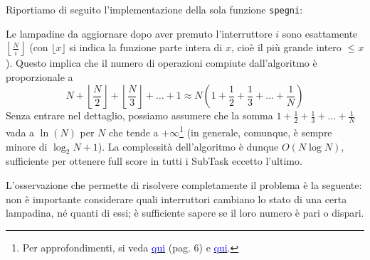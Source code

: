     Riportiamo di seguito l'implementazione della sola funzione \texttt{spegni}:
    
    \colorbox{white}{}
    
    \begin{comment}
        \begin{lstlisting}[language=C++]
int spegni(int N) {
    int ans = 0;
    
    // Preme l'i-esimo interruttore
    for (int i = 1; i <= N; i++)
        // Inverte tutte le lampadine multiple di i
        for (int j = i; j <= N; j += i)
            luci[j] ^= true;

    for (int i = 1; i <= N; i++)
        ans += !luci[i];

    return ans;
}
        \end{lstlisting}
    \end{comment}
    
    Le lampadine da aggiornare dopo aver premuto l'interruttore $i$ sono esattamente $\displaystyle \left \lfloor \frac N i \right \rfloor$ (con $\lfloor x \rfloor$ si indica la funzione parte intera di $x$, cioè il più grande intero $\leq x$). Questo implica che il numero di operazioni compiute dall'algoritmo è proporzionale a \[N + \left \lfloor \frac N 2 \right \rfloor + \left \lfloor \frac N 3 \right \rfloor + \dots + 1 \approx N \left ( 1 + \frac 1 2 + \frac 1 3 + \dots + \frac 1 N \right )\]
    Senza entrare nel dettaglio, possiamo assumere che la somma $\displaystyle 1 + \frac 1 2 + \frac 1 3 + \dots + \frac 1 N$ vada a $\ln (N)$ per $N$ che tende a $+ \infty$\footnote{Per approfondimenti, si veda \href{https://docs.google.com/file/d/0Bz82dCddeD8ieVZyUU9VMVI5bjA/view}{\textcolor{blue}{qui}} (pag. 6) e \href{http://en.wikipedia.org/wiki/Euler\%E2\%80\%93Mascheroni_constant}{\textcolor{blue}{qui}}.} (in generale, comunque, è sempre minore di $\log_2 N + 1$). La complessità dell'algoritmo è dunque $O(N \log N)$, sufficiente per ottenere full score in tutti i SubTask eccetto l'ultimo.
    
    \sqrtNlogNVeloce
    
    L'osservazione che permette di risolvere completamente il problema è la seguente: non è importante considerare quali interruttori cambiano lo stato di una certa lampadina, né quanti di essi; è sufficiente sapere se il loro numero è pari o dispari.


